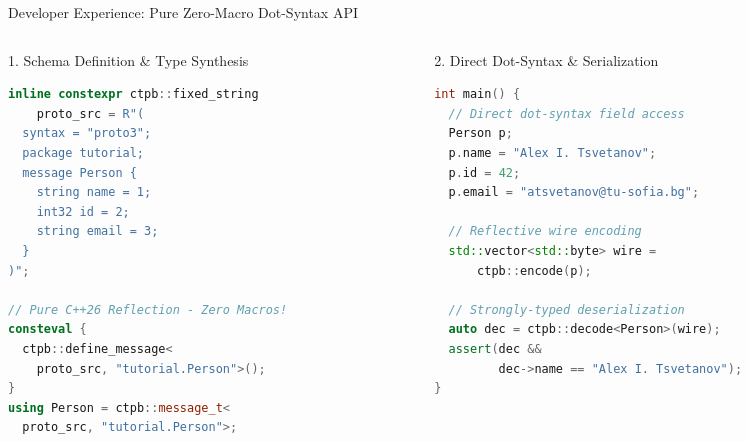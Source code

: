 \documentclass[aspectratio=169,10pt]{beamer}
\begin{document}
\begin{frame}[fragile]{Developer Experience: Pure Zero-Macro Dot-Syntax API}
  \begin{columns}[T]
    \begin{column}{0.48\textwidth}
      \begin{block}{1. Schema Definition \& Type Synthesis}
\begin{lstlisting}[language=C++]
inline constexpr ctpb::fixed_string 
    proto_src = R"(
  syntax = "proto3";
  package tutorial;
  message Person {
    string name = 1;
    int32 id = 2;
    string email = 3;
  }
)";

// Pure C++26 Reflection - Zero Macros!
consteval { 
  ctpb::define_message<
    proto_src, "tutorial.Person">(); 
}
using Person = ctpb::message_t<
  proto_src, "tutorial.Person">;
\end{lstlisting}
      \end{block}
    \end{column}

    \begin{column}{0.48\textwidth}
      \begin{block}{2. Direct Dot-Syntax \& Serialization}
\begin{lstlisting}[language=C++]
int main() {
  // Direct dot-syntax field access
  Person p;
  p.name = "Alex I. Tsvetanov";
  p.id = 42;
  p.email = "atsvetanov@tu-sofia.bg";

  // Reflective wire encoding
  std::vector<std::byte> wire = 
      ctpb::encode(p);

  // Strongly-typed deserialization
  auto dec = ctpb::decode<Person>(wire);
  assert(dec && 
         dec->name == "Alex I. Tsvetanov");
}
\end{lstlisting}
      \end{block}
    \end{column}
  \end{columns}
\end{frame}
\end{document}
